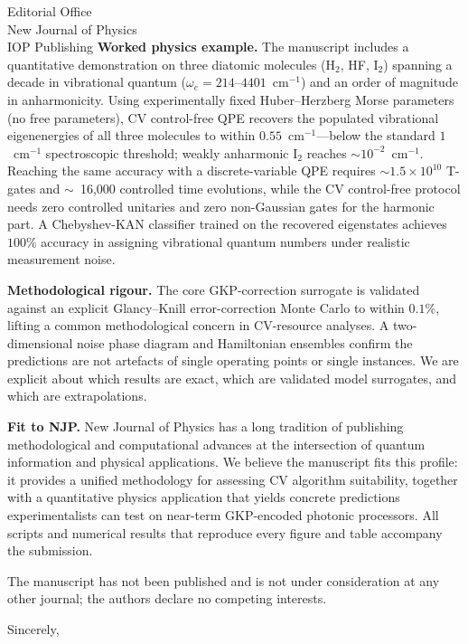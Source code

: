 \documentclass[11pt]{letter}
\begin{document}
\begin{letter}{Editorial Office \\ New Journal of Physics \\ IOP
Publishing}
\textbf{Worked physics example.} The manuscript includes a quantitative
demonstration on three diatomic molecules (H$_2$, HF, I$_2$) spanning a
decade in vibrational quantum ($\omega_e=214$--$4401$~cm$^{-1}$) and an
order of magnitude in anharmonicity. Using experimentally fixed
Huber--Herzberg Morse parameters (no free parameters), CV control-free
QPE recovers the populated vibrational eigenenergies of all three
molecules to within $0.55$~cm$^{-1}$---below the standard
$1$~cm$^{-1}$ spectroscopic threshold; weakly anharmonic I$_2$ reaches
$\sim\!10^{-2}$~cm$^{-1}$. Reaching the same accuracy with a
discrete-variable QPE requires $\sim 1.5\times10^{10}$ T-gates and
$\sim$~16{,}000 controlled time evolutions, while the CV control-free
protocol needs zero controlled unitaries and zero non-Gaussian gates
for the harmonic part. A Chebyshev-KAN classifier trained on the
recovered eigenstates achieves $100\%$ accuracy in assigning
vibrational quantum numbers under realistic measurement noise.

\textbf{Methodological rigour.} The core GKP-correction surrogate is
validated against an explicit Glancy--Knill error-correction Monte
Carlo to within $0.1\%$, lifting a common methodological concern in
CV-resource analyses. A two-dimensional noise phase diagram and
Hamiltonian ensembles confirm the predictions are not artefacts of
single operating points or single instances. We are explicit about
which results are exact, which are validated model surrogates, and
which are extrapolations.

\textbf{Fit to NJP.} New Journal of Physics has a long tradition of
publishing methodological and computational advances at the
intersection of quantum information and physical applications. We
believe the manuscript fits this profile: it provides a unified
methodology for assessing CV algorithm suitability, together with a
quantitative physics application that yields concrete predictions
experimentalists can test on near-term GKP-encoded photonic processors.
All scripts and numerical results that reproduce every figure and
table accompany the submission.

The manuscript has not been published and is not under consideration
at any other journal; the authors declare no competing interests.

\closing{Sincerely,}

\end{letter}
\end{document}
